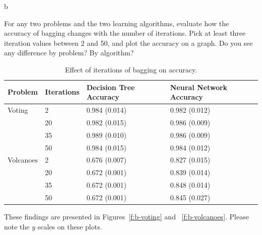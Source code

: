\documentclass[fleqn]{homework}
\begin{document}
  \begin{problem}{b}
    \begin{question}
      For any two problems and the two learning algorithms, evaluate how the
      accuracy of bagging changes with the number of iterations. Pick at least
      three iteration values between 2 and 50, and plot the accuracy on a
      graph. Do you see any difference by problem? By algorithm?
    \end{question}

    \begin{table}[h]
      \centering
      \caption{Effect of iterations of bagging on accuracy.}
      \label{t:b}
      \begin{tabular}{ll|ll}
        \toprule
        Problem   & Iterations & Decision Tree Accuracy & Neural Network Accuracy \\
        \midrule
        Voting    & 2          & 0.984 (0.014)          & 0.982 (0.012)            \\
                  & 20         & 0.982 (0.015)          & 0.986 (0.009)            \\
                  & 35         & 0.989 (0.010)          & 0.986 (0.009)            \\
                  & 50         & 0.984 (0.015)          & 0.984 (0.012)            \\
        \midrule
        Volcanoes & 2          & 0.676 (0.007)          & 0.827 (0.015)            \\
                  & 20         & 0.672 (0.001)          & 0.839 (0.014)            \\
                  & 35         & 0.672 (0.001)          & 0.848 (0.014)            \\
                  & 50         & 0.672 (0.001)          & 0.845 (0.027)            \\
        \bottomrule
      \end{tabular}
    \end{table}

    These findings are presented in Figures~\ref{f:b-voting} and
    ~\ref{f:b-volcanoes}.  Please note the $y$ scales on these plots.


\end{problem}
\end{document}

